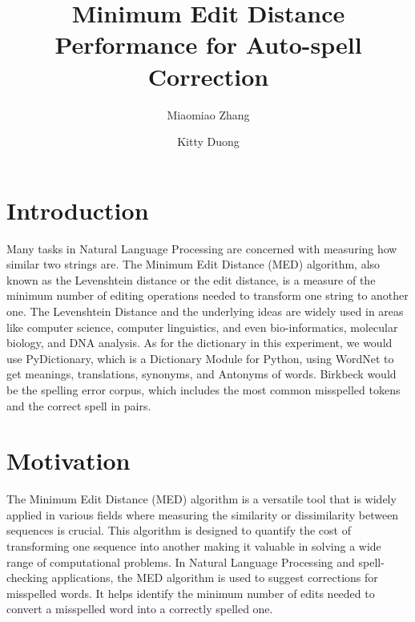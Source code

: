 \documentclass[sigconf]{acmart}
\begin{document}
\title{Minimum Edit Distance Performance for Auto-spell Correction}

\author{Miaomiao Zhang}

\author{Kitty Duong}

\maketitle

\section{Introduction}
Many tasks in Natural Language Processing are concerned with measuring how similar two strings are. The Minimum Edit Distance (MED) algorithm, also known as the Levenshtein distance or the edit distance, is a measure of the minimum number of editing operations needed to transform one string to another one. The Levenshtein Distance and the underlying ideas are widely used in areas like computer science, computer linguistics, and even bio-informatics, molecular biology, and DNA analysis. As for the dictionary in this experiment, we would use PyDictionary, which is a Dictionary Module for Python, using WordNet to get meanings, translations, synonyms, and Antonyms of words. Birkbeck would be the spelling error corpus, which includes the most common misspelled tokens and the correct spell in pairs.

\section{Motivation}
The Minimum Edit Distance (MED) algorithm is a versatile tool that is widely applied in various fields where measuring the similarity or dissimilarity between sequences is crucial. This algorithm is designed to quantify the cost of transforming one sequence into another making it valuable in solving a wide range of computational problems. In Natural Language Processing and spell-checking applications, the MED algorithm is used to suggest corrections for misspelled words. It helps identify the minimum number of edits needed to convert a misspelled word into a correctly spelled one.
\end{document}

